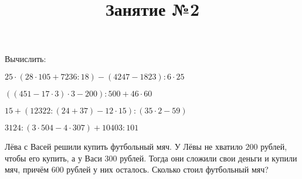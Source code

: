 \begin{listofex}
	\item Вычислить:
	\begin{enumcols}[itemcolumns=2]
		\item \( 25\cdot(28\cdot105+7236:18)-(4247-1823):6\cdot25 \)
		\item \( ((451-17\cdot3)\cdot3-200):500+46\cdot60 \)
		\item \( 15+(12322:(24+37)-12\cdot15):(35\cdot2-59) \)
		\item \( 3124:(3\cdot504-4\cdot307)+10403:101 \)
	\end{enumcols}
	\item Лёва с Васей решили купить футбольный мяч. У Лёвы не хватило \( 200 \) рублей, чтобы его
	купить, а у Васи \( 300 \) рублей. Тогда они сложили свои деньги и купили мяч,
	причём \( 600 \) рублей у них осталось. Сколько стоил футбольный мяч?
\end{listofex}
\newpage
\title{Занятие №2}
